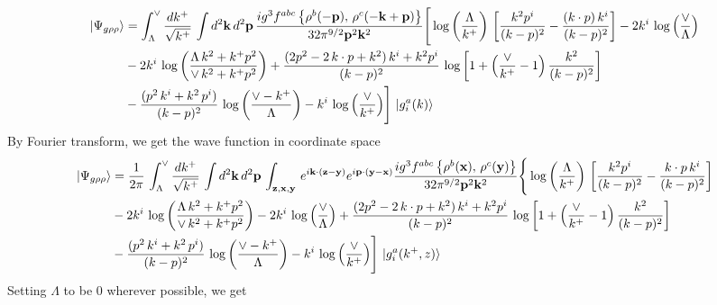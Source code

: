 \documentclass[aps,prd,amsmath,amssymb,nofootinbib]{revtex4-2}
\def\v#1{\mathbf{#1}}
\numberwithin{equation}{section}
\begin{document}
\begin{align}
    \left|\Psi_{g\rho\rho}\right\rangle & =  \int_{\Lambda}^{\vee}\frac{dk^{+}}{\sqrt{k^{+}}}\,\int d^{2}\mathbf{k}\, d^{2}\mathbf{p}\,\frac{ig^{3}f^{abc}\left\{ \rho^{b}(-\mathbf{p}),\,\rho^{c}(-\mathbf{k}+\mathbf{p})\right\}}{32\pi^{9/2}\mathbf{p}^{2}\mathbf{k}^{2}}\Bigg[\log{\left(\frac{\Lambda}{k^{+}}\right)}\,\left[\frac{k^{2}p^{i}}{(k-p)^{2}}-\frac{(k\cdot p)\,k^{i}}{(k-p)^{2}}\right]-2k^{i}\,\log{\left(\frac{\vee}{\Lambda}\right)}\notag \\ & -2k^{i}\,\log{\left(\frac{\Lambda\,k^{2} + k^{+}p^{2}}{\vee\, k^{2}+k^{+}p^{2}}\right)}+\frac{(2p^{2}-2\,k\cdot p + k^{2})\,k^{i} + k^{2}p^{i}}{(k-p)^{2}}\, \log{\left[1+\left(\frac{\vee}{k^{+}}-1\right)\frac{k^{2}}{(k-p)^{2}}\right]}\notag \\ & - \frac{(p^{2}\,k^{i}+k^{2}\,p^{i})}{(k-p)^{2}}\, \log{\left(\frac{\vee - k^{+}}{\Lambda}\right)}-k^{i}\, \log{\left(\frac{\vee}{k^{+}}\right)}\Bigg]\, \ket{g^{a}_{i}(k)}
\end{align}
By Fourier transform, we get the wave function in coordinate space
\begin{align}
    \left|\Psi_{g\rho\rho}\right\rangle & =  \frac{1}{2\pi}\,\int_{\Lambda}^{\vee}\frac{dk^{+}}{\sqrt{k^{+}}}\,\int d^{2}\mathbf{k}\, d^{2}\mathbf{p}\,\int_{\v{z},\v{x},\v{y}}\, e^{i\v{k}\cdot (\v{z}-\v{y})} e^{i\v{p}\cdot (\v{y}-\v{x})}\frac{ig^{3}f^{abc}\left\{ \rho^{b}(\mathbf{x}),\,\rho^{c}(\mathbf{y})\right\}}{32\pi^{9/2}\mathbf{p}^{2}\mathbf{k}^{2}}\Bigg\{\log{\left(\frac{\Lambda}{k^{+}}\right)}\,\left[\frac{k^{2}p^{i}}{(k-p)^{2}}-\frac{k\cdot p\,k^{i}}{(k-p)^{2}}\right]\notag \\ & -2k^{i}\,\log{\left(\frac{\Lambda\,k^{2} + k^{+}p^{2}}{\vee\, k^{2}+k^{+}p^{2}}\right)}-2k^{i}\,\log{\left(\frac{\vee}{\Lambda}\right)}+\frac{(2p^{2}-2\,k\cdot p + k^{2})\,k^{i} + k^{2}p^{i}}{(k-p)^{2}}\, \log{\left[1+\left(\frac{\vee}{k^{+}}-1\right)\frac{k^{2}}{(k-p)^{2}}\right]}\notag \\ & - \frac{(p^{2}\,k^{i}+k^{2}\,p^{i})}{(k-p)^{2}}\, \log{\left(\frac{\vee - k^{+}}{\Lambda}\right)}-k^{i}\, \log{\left(\frac{\vee}{k^{+}}\right)}\Bigg]\, \ket{g^{a}_{i}(k^{+},z)}
\end{align}
Setting $\Lambda $ to be $0$ wherever possible, we get
\end{document}
